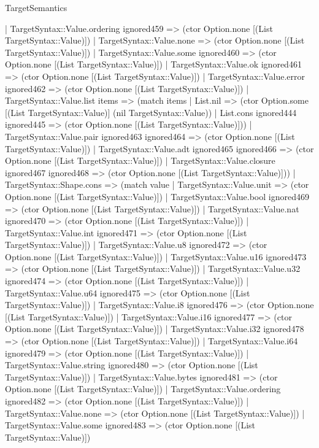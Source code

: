 \begin{lexlean}{TargetSemantics}
\begin{semanticmodule}
{      | TargetSyntax::Value.ordering ignored459 => (ctor Option.none [(List TargetSyntax::Value)])
      | TargetSyntax::Value.none => (ctor Option.none [(List TargetSyntax::Value)])
      | TargetSyntax::Value.some ignored460 => (ctor Option.none [(List TargetSyntax::Value)])
      | TargetSyntax::Value.ok ignored461 => (ctor Option.none [(List TargetSyntax::Value)])
      | TargetSyntax::Value.error ignored462 => (ctor Option.none [(List TargetSyntax::Value)])
      | TargetSyntax::Value.list items => (match items
        | List.nil => (ctor Option.some [(List TargetSyntax::Value)] (nil TargetSyntax::Value))
        | List.cons ignored444 ignored445 => (ctor Option.none [(List TargetSyntax::Value)]))
      | TargetSyntax::Value.pair ignored463 ignored464 => (ctor Option.none [(List TargetSyntax::Value)])
      | TargetSyntax::Value.adt ignored465 ignored466 => (ctor Option.none [(List TargetSyntax::Value)])
      | TargetSyntax::Value.closure ignored467 ignored468 => (ctor Option.none [(List TargetSyntax::Value)]))
    | TargetSyntax::Shape.cons => (match value
      | TargetSyntax::Value.unit => (ctor Option.none [(List TargetSyntax::Value)])
      | TargetSyntax::Value.bool ignored469 => (ctor Option.none [(List TargetSyntax::Value)])
      | TargetSyntax::Value.nat ignored470 => (ctor Option.none [(List TargetSyntax::Value)])
      | TargetSyntax::Value.int ignored471 => (ctor Option.none [(List TargetSyntax::Value)])
      | TargetSyntax::Value.u8 ignored472 => (ctor Option.none [(List TargetSyntax::Value)])
      | TargetSyntax::Value.u16 ignored473 => (ctor Option.none [(List TargetSyntax::Value)])
      | TargetSyntax::Value.u32 ignored474 => (ctor Option.none [(List TargetSyntax::Value)])
      | TargetSyntax::Value.u64 ignored475 => (ctor Option.none [(List TargetSyntax::Value)])
      | TargetSyntax::Value.i8 ignored476 => (ctor Option.none [(List TargetSyntax::Value)])
      | TargetSyntax::Value.i16 ignored477 => (ctor Option.none [(List TargetSyntax::Value)])
      | TargetSyntax::Value.i32 ignored478 => (ctor Option.none [(List TargetSyntax::Value)])
      | TargetSyntax::Value.i64 ignored479 => (ctor Option.none [(List TargetSyntax::Value)])
      | TargetSyntax::Value.string ignored480 => (ctor Option.none [(List TargetSyntax::Value)])
      | TargetSyntax::Value.bytes ignored481 => (ctor Option.none [(List TargetSyntax::Value)])
      | TargetSyntax::Value.ordering ignored482 => (ctor Option.none [(List TargetSyntax::Value)])
      | TargetSyntax::Value.none => (ctor Option.none [(List TargetSyntax::Value)])
      | TargetSyntax::Value.some ignored483 => (ctor Option.none [(List TargetSyntax::Value)])
}
\end{semanticmodule}
\end{lexlean}
